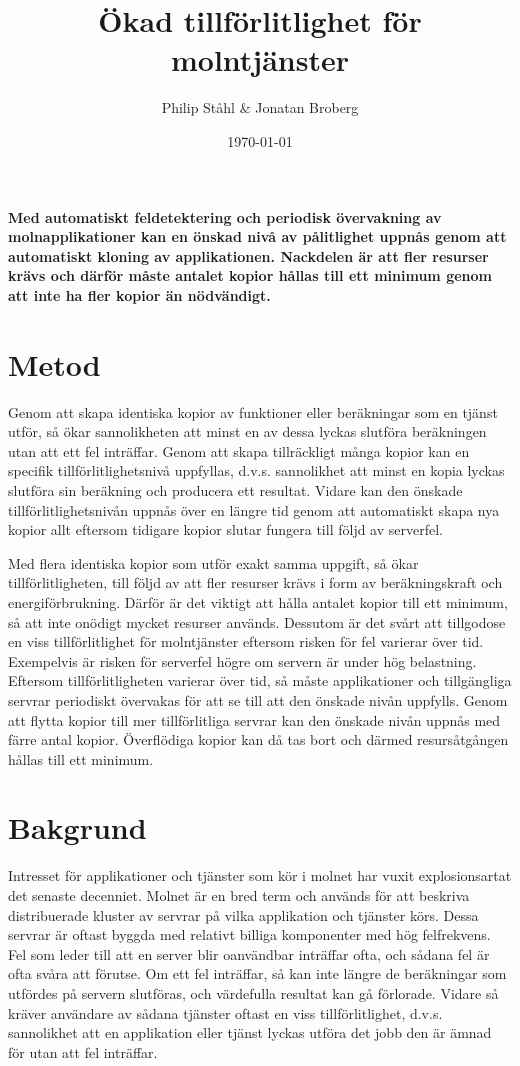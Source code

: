 \documentclass{article}
\author{
	Philip Ståhl \& Jonatan Broberg
}
\title{Ökad tillförlitlighet för molntjänster}
\date{\today}
\begin{document}
\maketitle

\begin{multicols}{2}
\noindent
\textbf{Med automatiskt feldetektering och periodisk övervakning av molnapplikationer kan en önskad nivå av pålitlighet uppnås genom att automatiskt kloning av applikationen. Nackdelen är att fler resurser krävs och därför måste antalet kopior hållas till ett minimum genom att inte ha fler kopior än nödvändigt.}

\section*{Metod}
Genom att skapa identiska kopior av funktioner eller beräkningar som en tjänst utför, så ökar sannolikheten att minst en av dessa lyckas slutföra beräkningen utan att ett fel inträffar. Genom att skapa tillräckligt många kopior kan en specifik tillförlitlighetsnivå uppfyllas, d.v.s. sannolikhet att minst en kopia lyckas slutföra sin beräkning och producera ett resultat. Vidare kan den önskade tillförlitlighetsnivån uppnås över en längre tid genom att automatiskt skapa nya kopior allt eftersom tidigare kopior slutar fungera till följd av serverfel.

Med flera identiska kopior som utför exakt samma uppgift, så ökar tillförlitligheten, till följd av att fler resurser krävs i form av beräkningskraft och energiförbrukning. Därför är det viktigt att hålla antalet kopior till ett minimum, så att inte onödigt mycket resurser används. Dessutom är det svårt att tillgodose en viss tillförlitlighet för molntjänster eftersom risken för fel varierar över tid. Exempelvis är risken för serverfel högre om servern är under hög belastning. Eftersom tillförlitligheten varierar över tid, så måste applikationer och tillgängliga servrar periodiskt övervakas för att se till att den önskade nivån uppfylls. Genom att flytta kopior till mer tillförlitliga servrar kan den önskade nivån uppnås med färre antal kopior. Överflödiga kopior kan då tas bort och därmed resursåtgången hållas till ett minimum.

\section*{Bakgrund}
Intresset för applikationer och tjänster som kör i molnet har vuxit explosionsartat det senaste decenniet. Molnet är en bred term och används för att beskriva distribuerade kluster av servrar på vilka applikation och tjänster körs. Dessa servrar är oftast byggda med relativt billiga komponenter med hög felfrekvens. Fel som leder till att en server blir oanvändbar inträffar ofta, och sådana fel är ofta svåra att förutse. Om ett fel inträffar, så kan inte längre de beräkningar som utfördes på servern slutföras, och värdefulla resultat kan gå förlorade. Vidare så kräver användare av sådana tjänster oftast en viss tillförlitlighet, d.v.s. sannolikhet att en applikation eller tjänst lyckas utföra det jobb den är ämnad för utan att fel inträffar. 


\end{multicols}
\end{document}
